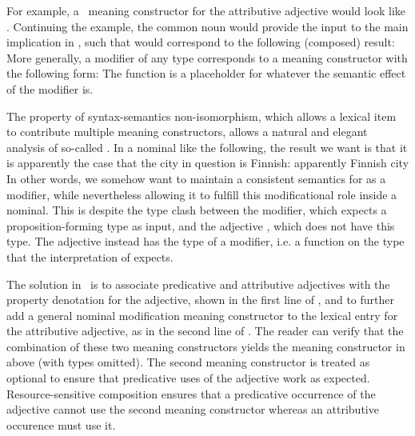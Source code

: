 \documentclass[output=paper,hidelinks]{langscibook}
\begin{document}
For example, a \glue\ meaning constructor for the attributive
adjective  would look like .
\ea\label{ex:glue-mod-finnish} 
\z
%
Continuing the example, the common noun  would provide the
 input to
the main implication in , such that
 would correspond to the following (composed)
result:
\ea {}
\z
%
More generally, a modifier of any type corresponds to a meaning
constructor with the following form:
\ea \label{ex:glue-mod-gen} \z
%
The function  is a placeholder for whatever the semantic
effect of the modifier is.

The property of syntax-semantics non-isomorphism, which allows a
lexical item to contribute multiple meaning constructors, allows a
natural and elegant analysis of so-called  \citep{kasper97}. In a nominal like the following, the
result we want is that it is apparently the case that the city in question
is Finnish:
\ea
apparently Finnish city
\z
%
In other words, we somehow want to maintain a consistent semantics for
 as a modifier, while nevertheless
allowing it to fulfill this modificational role inside a nominal. This
is despite the type clash between the modifier,
which expects a proposition-forming type as input, and the 
adjective , which does not have this type. The adjective
instead 
has the type of a modifier, i.e. a function on the type that
the interpretation of  expects. 

The solution in \glue\ is to associate predicative and attributive adjectives with
the property denotation for the adjective, shown in the first line of
, and to further add a general nominal
modification meaning constructor to the lexical entry for the
attributive adjective, as in the second line of .
\ea \label{ex:finnish-adj-lex}\label{ex:glue-mod-rec} 
\z
%
The reader can verify that the combination of these two meaning
constructors yields the meaning constructor in  above (with
types omitted). The second meaning constructor is treated as optional
to ensure that predicative uses of the adjective work as
expected. Resource-sensitive composition ensures that a predicative
occurrence of the adjective cannot use the second meaning constructor whereas
an attributive occurence must use it. 
\end{document}
